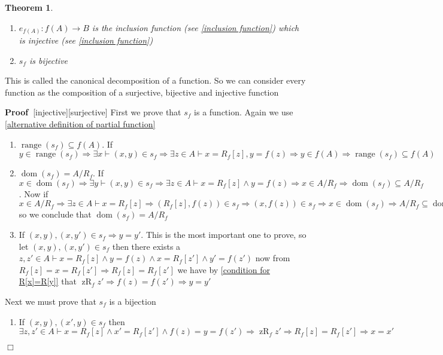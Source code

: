 \documentclass{book}
\newcommand{\tmop}[1]{\ensuremath{\operatorname{#1}}}
\newenvironment{proof}{\noindent\textbf{Proof\ }}{\hspace*{\fill}$\Box$\medskip}
\newtheorem{theorem}{Theorem}
\begin{document}
{{\begin{theorem}
\begin{enumerate}
    \item $e_{f (A)} : f (A) \rightarrow B$ is the inclusion function (see
    \ref{inclusion function}) which is injective (see \ref{inclusion
    function})
    
    \item $s_f$ is bijective
  \end{enumerate}
\end{theorem}

This is called the canonical decomposition of a function. So we can consider
every function as the composition of a surjective, bijective and injective
function

\begin{proof}[injective][surjective]
  First we prove that $s_f$ is a function. Again we use \ref{alternative
  definition of partial function}
  \begin{enumerate}
    \item $\tmop{range} (s_f) \subseteq f (A)$. If $y \in \tmop{range} (s_f)
    \Rightarrow \exists x \vdash (x, y) \in s_f \Rightarrow \exists z \in A
    \vdash x = R_f [z], y = f (z) \Rightarrow y \in f (A) \Rightarrow
    \tmop{range} (s_f) \subseteq f (A)$
    
    \item $\tmop{dom} (s_f) = A / R_f$. If $x \in \tmop{dom} (s_f) \Rightarrow
    \exists y \vdash (x, y) \in s_f \Rightarrow \exists z \in A \vdash x = R_f
    [z] \wedge y = f (z) \Rightarrow x \in A / R_f \Rightarrow \tmop{dom}
    (s_f) \subseteq A / R_f$. Now if $x \in A / R_f \Rightarrow \exists z \in
    A \vdash x = R_f [z] \Rightarrow (R_f [z], f (z)) \in s_f \Rightarrow (x,
    f (z)) \in s_f \Rightarrow x \in \tmop{dom} (s_f) \Rightarrow A / R_f
    \subseteq \tmop{dom} (s_f)$ so we conclude that $\tmop{dom} (s_f) = A /
    R_f$
    
    \item If $(x, y), (x, y') \in s_f \Rightarrow y = y'$. This is the most
    important one to prove, so let $(x, y), (x, y') \in s_f$ then there exists
    a $z, z' \in A \vdash x = R_f [z] \wedge y = f (z) \wedge x = R_f [z']
    \wedge y' = f (z')$ now from $R_f [z] = x = R_f [z'] \Rightarrow R_f [z] =
    R_f [z']$ we have by \ref{condition for R[x]=R[y]} that $\tmop{zR}_f z'
    \Rightarrow f (z) = f (z') \Rightarrow y = y'$
  \end{enumerate}
  Next we must prove that $s_f$ is a bijection
  \begin{enumerate}
    \item If $(x, y), (x', y) \in s_f$ then $\exists z, z' \in A \vdash x =
    R_f [z] \wedge x' = R_f [z'] \wedge f (z) = y = f (z') \Rightarrow
    \tmop{zR}_f z' \Rightarrow R_f [z] = R_f [z'] \Rightarrow x = x'$
    

\end{enumerate}
\end{proof}}}
\end{document}
